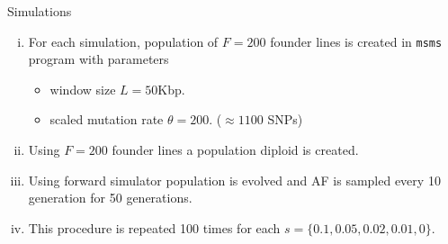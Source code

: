 \documentclass[t]{beamer} %
\begin{document}
\begin{frame}{Simulations}
\begin{enumerate}[(i)]
\item For each simulation, population of $F=200$ founder lines is created in  
\texttt{msms} program with parameters 
\begin{itemize}
\item window size $L=50$Kbp.
\item scaled mutation rate $\theta=200$. ($\approx 1100$ SNPs)
\end{itemize}

\item Using $F=200$ founder lines a population diploid is created.
\item Using forward simulator population is evolved and AF is sampled every 
10 
generation for 50 generations. 
\item This procedure is repeated 100 times for each $s=\{0.1, 0.05, 0.02, 
0.01, 0\}$.
\end{enumerate}
\end{frame}


\end{document}
